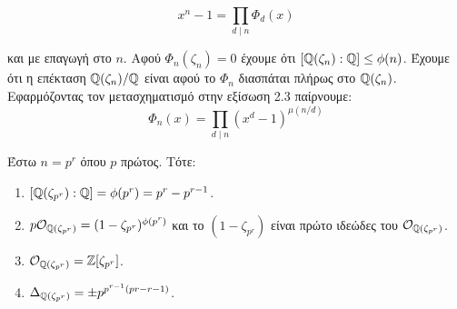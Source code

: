 \documentclass{report}
\begin{document}
\begin{equation} \label{eq2.2}
	x^n-1 = \prod\limits_{d \mid n} \Phi_d(x)
\end{equation}

και με επαγωγή στο $n$. Αφού $\Phi_n(\zeta_n) = 0$ έχουμε ότι $[\mathbb{Q}(\zeta_n):\mathbb{Q}] \leq \phi(n)$. Έχουμε ότι η επέκταση $\mathbb{Q}(\zeta_n)/\mathbb{Q}$ είναι  αφού το $\Phi_n$ διασπάται πλήρως στο $\mathbb{Q}(\zeta_n)$. Εφαρμόζοντας τον μετασχηματισμό  στην εξίσωση 2.3 παίρνουμε:
$$\Phi_n(x) = \prod\limits_{d\mid n} (x^d-1)^{\mu(n/d)}$$

\begin{lemma}Έστω $n=p^r$ όπου $p$ πρώτος. Τότε:
	\begin{enumerate}
	\item $[\mathbb{Q}(\zeta_{p^r}):\mathbb{Q}] = \phi(p^r) = p^r-p^{r-1}$.
	\item $p \mathcal{O}_{\mathbb{Q}(\zeta_{p^r})} = (1-\zeta_{p^r})^{\phi(p^r)}$ και το $(1-\zeta_{p^r})$ είναι πρώτο ιδεώδες του $\mathcal{O}_{\mathbb{Q}(\zeta_{p^r})}$.
	\item $\mathcal{O}_{\mathbb{Q}(\zeta_{p^r})} = \mathbb{Z}[\zeta_{p^r}]$.
	\item $\Delta_{\mathbb{Q}(\zeta_{p^r})} = \pm p^{p^{r-1}(pr-r-1)}$. 
	\end{enumerate}
\end{lemma}
\end{document}
